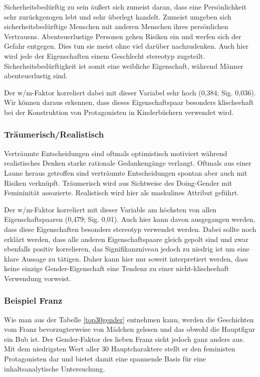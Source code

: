 Sicherheitsbedürftig zu sein äußert sich zumeist daran, dass eine
Persönlichkeit sehr zurückgezogen lebt und sehr überlegt handelt.
Zumeist umgeben sich sicherheitsbedürftige Menschen mit anderen Menschen
ihres persönlichen Vertrauens. Abenteuerlustige Personen gehen Risiken
ein und werfen sich der Gefahr entgegen. Dies tun sie meist ohne viel
darüber nachzudenken. Auch hier wird jede der Eigenschaften einem
Geschlecht stereotyp zugeteilt. Sicherheitsbedürftigkeit ist somit eine
weibliche Eigenschaft, während Männer abenteuerlustig sind.

Der w/m-Faktor korreliert dabei mit dieser Variabel sehr hoch (0,384;
Sig. 0,036). Wir können daraus erkennen, dass dieses Eigenschaftspaar
besonders klischeehaft bei der Konstruktion von Protagonisten in
Kinderbüchern verwendet wird.

\subsubsection{Träumerisch/Realistisch}

Verträumte Entscheidungen sind oftmals optimistisch motiviert während
realistisches Denken starke rationale Gedankengänge verlangt. Oftmals
aus einer Laune heraus getroffen sind verträumte Entscheidungen spontan
aber auch mit Risiken verknüpft. Träumerisch wird aus Sichtweise des
Doing-Gender mit Femininität assozierte. Realistisch wird hier als
maskulines Attribut geführt.

Der w/m-Faktor korreliert mit dieser Variable am höchsten von allen
Eigenschaftspaaren (0,479; Sig. 0,01). Auch hier kann davon ausgegangen
werden, dass diese Eigenschaften besonders stereotyp verwendet werden.
Dabei sollte noch erklärt werden, dass alle anderen Eigenschaftspaare
gleich gepolt sind und zwar ebenfalls positiv korrelieren, das
Signifikanzniveau jedoch zu niedrig ist um eine klare Aussage zu
tätigen. Daher kann hier nur soweit interpretiert werden, dass keine
einzige Gender-Eigenschaft eine Tendenz zu einer nicht-klischeehaft
Verwendung vorweist.

\subsubsection{Beispiel Franz}

Wie man aus der Tabelle \ref{top30gender} entnehmen kann, werden die
Geschichten vom Franz bevorzugterweise von Mädchen gelesen und das
obwohl die Hauptfigur ein Bub ist. Der Gender-Faktor des lieben Franz
sieht jedoch ganz anders aus. Mit dem niedrigsten Wert aller 30
Hauptcharaktere stellt er den feministen Protagonisten dar und bietet
damit eine spannende Basis für eine inhaltsanalytische Untersuchung.

